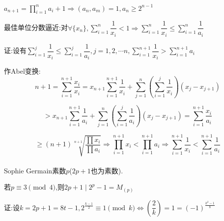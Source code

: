 $  a_{n+1}=\prod_{i=1}^{n}{a_i}+1\Rightarrow (a_n,a_m)=1,a_n\ge 2^{n-1}  $ 

最佳单位分数逼近:对$ \forall \{x_n\},\sum_{i=1}^{n}{\dfrac{1}{x_i}}<1\Rightarrow \sum_{i=1}^{n}{\dfrac{1}{x_i}}\le \sum_{i=1}^{n}{\dfrac{1}{a_i}}$

证:设有$ \sum_{i=1}^{j}{\dfrac{1}{x_i}}\le \sum_{i=1}^{j}{\dfrac{1}{a_i}},j=1,2,\cdots n,\sum_{i=1}^{n+1}{\dfrac{1}{x_i}}> \sum_{i=1}^{n+1}{a_i}$

作Abel变换:\[  n+1=\sum_{i=1}^{n+1}{\dfrac{x_i}{x_i}}=x_{n+1}\sum_{i=1}^{n+1}{\dfrac{1}{x_i}}+\sum_{j=1}^{n}{(\sum_{i=1}^{j}{\dfrac{1}{x_i}})(x_j-x_{j+1})} \]

\[ > x_{n+1}\sum_{i=1}^{n+1}{\dfrac{1}{a_i}}+\sum_{j=1}^{n}{(\sum_{i=1}^{j}{\dfrac{1}{a_i}})(x_j-x_{j+1})}=\sum_{i=1}^{n+1}{\dfrac{x_i}{a_i}}\]

\[ \ge (n+1) \sqrt[n+1]{\dfrac{\prod{x_i}}{\prod{a_i}}}\Rightarrow \prod_{i=1}^{n+1}{x_i}<\prod_{i=1}^{n+1}{a_i}\Rightarrow \sum_{i=1}^{n+1}{\dfrac{1}{x_i}}<\sum_{i=1}^{n+1}{\dfrac{1}{a_i}}\] 
\\

Sophie Germain素数$ p$($ 2p+1$也为素数).

若$ p\equiv 3 \pmod 4$,则$ 2p+1 \mid 2^p-1=M_{(p)}$

证:设$ k=2p+1=8t-1,2^{\frac{k-1}{2}}\equiv 1 \pmod k\Leftrightarrow (\dfrac{2}{k})=1=(-1)^{\frac{k^2-1}{8}}$
